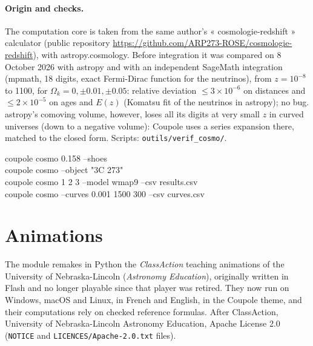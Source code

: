\paragraph{Origin and checks.} The computation core is taken from the same author's « cosmologie-redshift »
calculator (public repository \url{https://github.com/ARP273-ROSE/cosmologie-redshift}), with astropy.cosmology.
Before integration it was compared on 8 October 2026 with astropy and with an independent SageMath integration
(mpmath, 18 digits, exact Fermi-Dirac function for the neutrinos), from $z = 10^{-8}$ to 1100, for
$\Omega_k = 0, \pm0.01, \pm0.05$: relative deviation $\le 3\times10^{-6}$ on distances and $\le 2\times10^{-5}$ on
ages and $E(z)$ (Komatsu fit of the neutrinos in astropy); no bug. astropy's comoving volume, however, loses all
its digits at very small $z$ in curved universes (down to a negative volume): Coupole uses a series expansion there,
matched to the closed form. Scripts: \texttt{outils/verif\_cosmo/}.

\begin{ccode}
coupole cosmo 0.158 --shoes\\
coupole cosmo --object "3C 273"\\
coupole cosmo 1 2 3 --model wmap9 --csv results.csv\\
coupole cosmo --curves 0.001 1500 300 --csv curves.csv
\end{ccode}

\section{Animations}\label{sec:anim}
The module remakes in Python the \emph{ClassAction} teaching animations of the University of Nebraska-Lincoln
(\emph{Astronomy Education}), originally written in Flash and no longer playable since that player was retired. They
now run on Windows, macOS and Linux, in French and English, in the Coupole theme, and their computations rely on
checked reference formulas. After ClassAction, University of Nebraska-Lincoln Astronomy Education, Apache License 2.0
(\texttt{NOTICE} and \texttt{LICENCES/Apache-2.0.txt} files).

